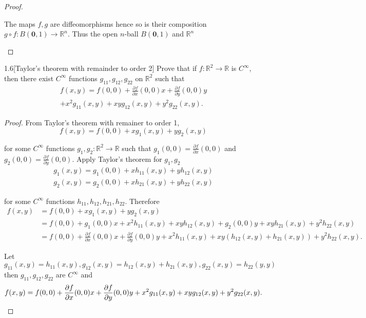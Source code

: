 \begin{proof}
\begin{enumerate}[label={(\alph*)},leftmargin=*]
              The maps \( f, g \) are diffeomorphisms hence so is their composition \( g\circ f: B(\mathbf{0}, 1) \to \mathbb{R}^{n} \). Thus the open \(n\)-ball \( B(\mathbf{0}, 1) \) and \( \mathbb{R}^{n} \)
    \end{enumerate}
\end{proof}

\begin{problem}{1.6}[Taylor's theorem with remainder to order 2]
Prove that if \( f : \mathbb{R}^{2} \to \mathbb{R} \) is \( C^{\infty} \), then there exist \( C^{\infty} \) functions \( g_{11}, g_{12}, g_{22} \) on \( \mathbb{R}^{2} \) such that
\begin{multline*}
    f(x,y) = f(0,0) + \frac{\partial f}{\partial x} (0,0)x + \frac{\partial f}{\partial y} (0,0)y \\
    + x^{2} g_{11}(x,y) + xy g_{12}(x,y) + y^{2} g_{22}(x,y).
\end{multline*}
\end{problem}

\begin{proof}
    From Taylor's theorem with remainer to order 1,
    \[
        f(x, y) = f(0, 0) + xg_{1}(x, y) + yg_{2}(x, y)
    \]

    for some \( C^{\infty} \) functions \( g_{1}, g_{2}: \mathbb{R}^{2} \to \mathbb{R} \) such that \( g_{1}(0, 0) = \frac{\partial f}{\partial x}(0, 0) \) and \( g_{2}(0, 0) = \frac{\partial f}{\partial y}(0, 0) \). Apply Taylor's theorem for \( g_{1}, g_{2} \)
    \[
        \begin{split}
            g_{1}(x, y) = g_{1}(0, 0) + xh_{11}(x, y) + yh_{12}(x, y) \\
            g_{2}(x, y) = g_{2}(0, 0) + xh_{21}(x, y) + yh_{22}(x, y)
        \end{split}
    \]

    for some \( C^{\infty} \) functions \( h_{11}, h_{12}, h_{21}, h_{22} \). Therefore
    \begin{align*}
        f(x, y) & = f(0, 0) + xg_{1}(x, y) + yg_{2}(x, y)                                                                                                                            \\
                & = f(0, 0) + g_{1}(0, 0)x + x^{2}h_{11}(x, y) + xyh_{12}(x, y) + g_{2}(0, 0)y + xyh_{21}(x, y) + y^{2}h_{22}(x, y)                                                  \\
                & = f(0, 0) + \frac{\partial f}{\partial x}(0, 0)x + \frac{\partial f}{\partial y}(0, 0)y + x^{2}h_{11}(x, y) + xy(h_{12}(x, y) + h_{21}(x, y)) + y^{2}h_{22}(x, y).
    \end{align*}

    Let \( g_{11}(x, y) = h_{11}(x, y), g_{12}(x, y) = h_{12}(x, y) + h_{21}(x, y), g_{22}(x, y) = h_{22}(y, y) \) then \( g_{11}, g_{12}, g_{22} \) are \( C^{\infty} \) and
    \[
        f(x, y) = f(0, 0) + \frac{\partial f}{\partial x}(0, 0)x + \frac{\partial f}{\partial y}(0, 0)y + x^{2}g_{11}(x, y) + xyg_{12}(x, y) + y^{2}g_{22}(x, y). \qedhere
    \]
\end{proof}

